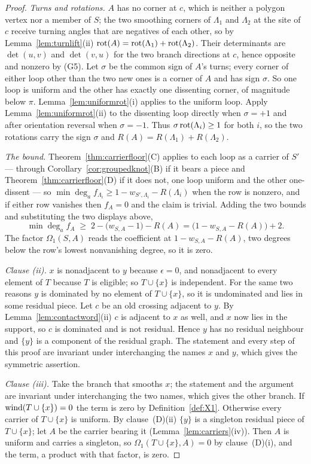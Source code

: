 \begin{proof}
\emph{Turns and rotations.} $A$ has no corner at $c$, which is neither a
polygon vertex nor a member of $S$; the two smoothing corners of $\Lambda_1$ and
$\Lambda_2$ at the site of $c$ receive turning angles that are negatives of
each other, so by Lemma~\ref{lem:turnlift}(ii)
$\operatorname{rot}(A)=\operatorname{rot}(\Lambda_1)+\operatorname{rot}(\Lambda_2)$. Their determinants are $\det(u,v)$
and $\det(v,u)$ for the two branch directions at $c$, hence opposite and
nonzero by (G5). Let $\sigma$ be the common sign of $A$'s turns; every corner of
either loop other than the two new ones is a corner of $A$ and has sign
$\sigma$. So one loop is uniform and the other has exactly one dissenting
corner, of magnitude below $\pi$. Lemma~\ref{lem:uniformrot}(i) applies to the
uniform loop. Apply Lemma~\ref{lem:uniformrot}(ii) to the dissenting loop
directly when $\sigma=+1$ and after orientation reversal when $\sigma=-1$.
Thus $\sigma\operatorname{rot}(\Lambda_i)\geq1$ for both $i$, so the two rotations carry the
sign $\sigma$ and $R(A)=R(\Lambda_1)+R(\Lambda_2)$.

\emph{The bound.} Theorem~\ref{thm:carrierfloor}(C) applies to each loop as a
carrier of $S'$ --- through Corollary~\ref{cor:groupedknot}(B) if it bears a piece
and Theorem~\ref{thm:carrierfloor}(D) if it does not, one loop uniform and the other
one-dissent --- so
$\min\deg_af_{\Lambda_i}\geq1-w_{S',\Lambda_i}-R(\Lambda_i)$ when the row is
nonzero, and if either row vanishes then $f_A=0$ and the claim is trivial.
Adding the two bounds and substituting the two displays above,
\[
   \min\deg_af_A\;\geq\;2-\bigl(w_{S,A}-1\bigr)-R(A)
   =\bigl(1-w_{S,A}-R(A)\bigr)+2 .
\]
The factor $\Omega_1(S,A)$ reads the coefficient at $1-w_{S,A}-R(A)$, two
degrees below the row's lowest nonvanishing degree, so it is zero.

\emph{Clause (ii).} $x$ is nonadjacent to $y$ because $\epsilon=0$, and nonadjacent to every element
of $T$ because $T$ is eligible; so $T\cup\{x\}$ is independent. For the same two
reasons $y$ is dominated by no element of $T\cup\{x\}$, so it is undominated and
lies in some residual piece. Let $c$ be an old crossing adjacent to $y$. By
Lemma~\ref{lem:contactword}(ii) $c$ is adjacent to $x$ as well, and $x$ now lies in
the support, so $c$ is dominated and is not residual. Hence $y$ has no residual
neighbour and $\{y\}$ is a component of the residual graph. The statement and
every step of this proof are invariant under interchanging the names $x$ and
$y$, which gives the symmetric assertion.

\emph{Clause (iii).} Take the branch that smooths $x$; the statement and the argument are invariant
under interchanging the two names, which gives the other branch. If
$\operatorname{wind}(T\cup\{x\})=0$ the term is zero by Definition~\ref{def:X1}. Otherwise
every carrier of $T\cup\{x\}$ is uniform. By clause~(D)(ii) $\{y\}$ is a singleton residual piece of
$T\cup\{x\}$; let $A$ be the carrier bearing it
(Lemma~\ref{lem:carriers}(iv)). Then $A$ is uniform and carries a singleton,
so $\Omega_1(T\cup\{x\},A)=0$ by clause~(D)(i), and the term, a
product with that factor, is zero.


\end{proof}
